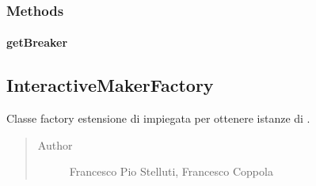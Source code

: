 \documentclass[letterpaper,10pt,italian,openany,oneside]{sphinxmanual}
\begin{document}
\subsubsection{Methods}
\label{\detokenize{source/it/unicam/cs/pa/mastermind/factories/InteractiveBreakerFactory:methods}}

\paragraph{getBreaker}
\label{\detokenize{source/it/unicam/cs/pa/mastermind/factories/InteractiveBreakerFactory:getbreaker}}

\begin{fulllineitems}
\label{\detokenize{source/it/unicam/cs/pa/mastermind/factories/InteractiveBreakerFactory:it.unicam.cs.pa.mastermind.factories.InteractiveBreakerFactory.getBreaker()}}
\end{fulllineitems}



\subsection{InteractiveMakerFactory}
\label{\detokenize{source/it/unicam/cs/pa/mastermind/factories/InteractiveMakerFactory:interactivemakerfactory}}\label{\detokenize{source/it/unicam/cs/pa/mastermind/factories/InteractiveMakerFactory::doc}}

\begin{fulllineitems}
\label{\detokenize{source/it/unicam/cs/pa/mastermind/factories/InteractiveMakerFactory:it.unicam.cs.pa.mastermind.factories.InteractiveMakerFactory}}
Classe factory estensione di  impiegata per ottenere istanze di .
\begin{quote}\begin{description}
\item[{Author}] \leavevmode
Francesco Pio Stelluti, Francesco Coppola

\end{description}\end{quote}

\end{fulllineitems}
\end{document}
